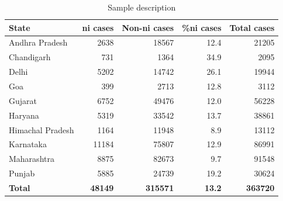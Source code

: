 \documentclass[12pt,a4paper]{article}
\begin{document}
\begin{table}[!ht]
\caption{Sample description} \label{tab:sample_desc}
\centering
\footnotesize
\begin{tabular}{lrrr|r}
\toprule
\textbf{State} & \textbf{\gls{ni} cases} & \textbf{Non-\gls{ni} cases} & \textbf{\%\gls{ni} cases} & \textbf{Total cases}\\ \midrule
Andhra Pradesh & 2638 & 18567 & 12.4 & 21205\\
Chandigarh & 731 & 1364 & 34.9 & 2095\\
Delhi & 5202 & 14742 & 26.1 & 19944\\
Goa & 399 & 2713 & 12.8 & 3112\\
Gujarat & 6752 & 49476 & 12.0 & 56228\\
Haryana & 5319 & 33542 & 13.7 & 38861\\
Himachal Pradesh & 1164 & 11948 & 8.9 & 13112\\
Karnataka & 11184 & 75807 & 12.9 & 86991\\
Maharashtra & 8875 & 82673 & 9.7 & 91548\\
Punjab & 5885 & 24739 & 19.2 & 30624\\
\midrule
\textbf{Total} & \textbf{48149} & \textbf{315571} & \textbf{13.2} & \textbf{363720}\\ \bottomrule
\end{tabular}
\end{table}
\end{document}

